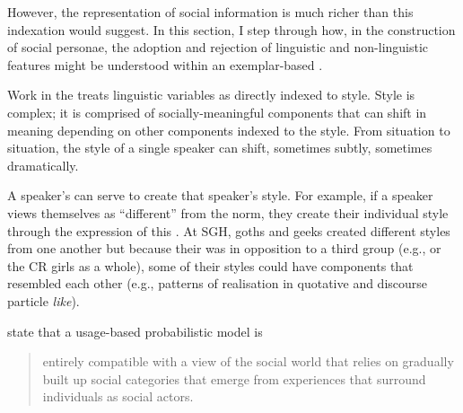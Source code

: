 However, the representation of social information is much richer than this indexation would suggest.  In this section, I step through how, in the construction of social personae, the adoption and rejection of linguistic and non-linguistic features might be understood within an exemplar-based .

Work in the  treats linguistic variables as directly indexed to style.  Style is complex; it is comprised of socially-meaningful components that can shift in meaning depending on other components indexed to the style.  From situation to situation, the style of a single speaker can shift, sometimes subtly, sometimes dramatically.  

A speaker's  can serve to create that speaker's style.  For example, if a speaker views themselves as ``different'' from the norm, they create their indivi\-dual style through the expression of this .  At SGH, goths and geeks created different styles from one another but because their  was in opposition to a third group (e.g.,  or the CR girls as a whole), some of their styles could have components that resembled each other (e.g., patterns of  realisation in quotative and discourse particle \textit{like}).

\citet{mendozadentonetal2003} state that a usage-based probabilistic model is

\begin{quote}
entirely compatible with a view of the social world that relies on gradually built up social categories that emerge from experiences that surround individuals as social actors. \citep[136]{mendozadentonetal2003}
\end{quote}

